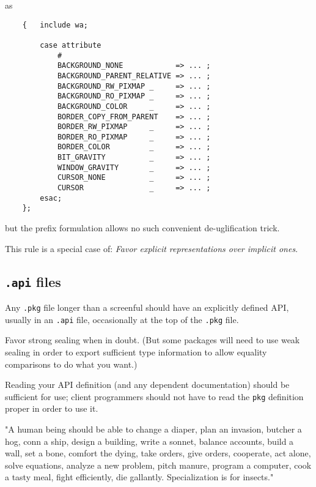 as

\begin{verbatim}
    {   include wa;

        case attribute
            #
            BACKGROUND_NONE            => ... ;
            BACKGROUND_PARENT_RELATIVE => ... ;
            BACKGROUND_RW_PIXMAP _     => ... ;
            BACKGROUND_RO_PIXMAP _     => ... ;
            BACKGROUND_COLOR     _     => ... ;
            BORDER_COPY_FROM_PARENT    => ... ;
            BORDER_RW_PIXMAP     _     => ... ;
            BORDER_RO_PIXMAP     _     => ... ;
            BORDER_COLOR         _     => ... ;
            BIT_GRAVITY          _     => ... ; 
            WINDOW_GRAVITY       _     => ... ;
            CURSOR_NONE          _     => ... ;
            CURSOR               _     => ... ;
        esac;
    };
\end{verbatim}

but the prefix formulation allows no such convenient de-uglification trick.

This rule is a special case of: {\it Favor explicit representations over implicit ones}.

\subsection{{\tt .api} files}

Any {\tt .pkg} file longer than a screenful should have an explicitly 
defined API, usually in an {\tt .api} file, occasionally at the top 
of the {\tt .pkg} file.

Favor strong sealing when in doubt.  (But some packages will need 
to use weak sealing in order to export sufficient type information 
to allow equality comparisons to do what you want.) 

Reading your {\sc API} definition (and any dependent documentation) should 
be sufficient for use;  client programmers should not have to read 
the {\tt pkg} definition proper in order to use it.




    "A human being should be able to change a diaper, plan an invasion,
     butcher a hog, conn a ship, design a building, write a sonnet, balance 
     accounts, build a wall, set a bone, comfort the dying, take orders,
     give orders, cooperate, act alone, solve equations, analyze a new 
     problem, pitch manure, program a computer, cook a tasty meal, fight 
     efficiently, die gallantly. Specialization is for insects."

